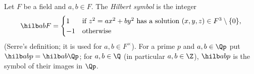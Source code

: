 Let $F$ be a field and $a,b\in F$. The \emph{Hilbert symbol} is the integer
\[
  \hilb abF=\begin{cases}1&\text{if }z^2=ax^2+by^2\text{ has a solution }(x,y,z)\in F^3\setminus\{0\},\\-1&\text{otherwise}\end{cases}
\]
(Serre's definition; it is used for $a,b\in F^\times$). For a prime $p$ and $a,b\in\Qp$ put $\hilb abp=\hilb ab{\Qp}$; for $a,b\in\Q$ (in particular
$a,b\in\Z$), $\hilb abp$ is the symbol of their images in $\Qp$.
